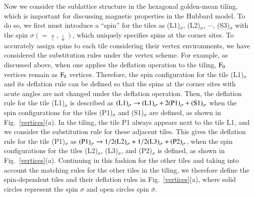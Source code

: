 \documentclass[aps,twocolumn,pra,superscriptaddress,amsmath,amssymb]{revtex4-1}
\begin{document}
Now we consider the sublattice structure in the hexagonal golden-mean tiling,
which is important for discussing magnetic properties in the Hubbard model.
To do so,
we first must introduce a ``spin'' for the tiles
as (L1)$_\sigma$, (L2)$_\sigma$, $\cdots$, (S3)$_\sigma$
with the spin $\sigma(=\uparrow, \downarrow)$,
which uniquely specifies spins at the corner sites.
To accurately assign spins to each tile considering their vertex environments,
we have considered the substitution rules under the vertex scheme.
For example, as discussed above, when one applies the deflation operation to the tiling,
${\rm F}_{0}$ vertices remain as ${\rm F}_{0}$ vertices.
Therefore, the spin configuration for the tile (L1)$_\sigma$ and its deflation rule can be defined so that
the spins at the corner sites with acute angles are not changed under the deflation operation.
Then, the deflation rule for the tile (L1)$_\sigma$ is described as
${\rm (L1)}_\sigma \rightarrow {\rm (L1)}_\sigma+ 2{\rm (P1)}_\sigma+{\rm (S1)}_\sigma$
when the spin configurations for the tiles (P1)$_\sigma$ and (S1)$_\sigma$ are defined,
as shown in Fig.~\ref{vertices}(a). 
In the tiling, the tile P1 always appears next to the tile L1, and
we consider the substitution rule for these adjacent tiles.
This gives the deflation rule for the tile (P1)$_\sigma$ as
${\rm (P1)}_\sigma\rightarrow 1/2 {\rm (L2)}_\sigma+1/2{\rm (L3)}_\sigma+{\rm (P2)}_\sigma$,
when the spin configurations for the tiles (L2)$_\sigma$, (L3)$_\sigma$, and (P2)$_\sigma$
is defined, as shown in Fig.~\ref{vertices}(a).
Continuing in this fashion for the other tiles and
taking into account the matching rules for the other tiles in the tiling,
we therefore define the spin-dependent tiles and their deflation rules in Fig.~\ref{vertices}(a), where
solid circles represent the spin $\sigma$ and open circles spin $\bar{\sigma}$.
\end{document}
